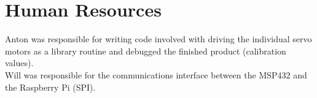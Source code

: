 \documentclass[10pt]{article}
\begin{document}
\section{Human Resources}
Anton was responsible for writing code involved with driving the individual servo motors as a library routine and debugged the finished product (calibration values).\\
Will was responsible for the communications interface between the MSP432 and the Raspberry Pi (SPI).




\end{document}
